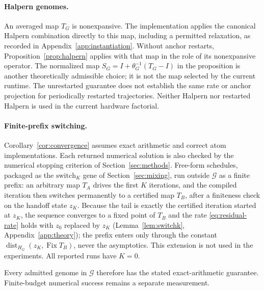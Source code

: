 \paragraph{Halpern genomes.}
An averaged map $T_G$ is nonexpansive. The implementation applies the
canonical Halpern combination directly to this map, including a permitted
relaxation, as recorded in Appendix~\ref{app:instantiation}. Without anchor
restarts, Proposition~\ref{prop:halpern} applies with that map in the role of
its nonexpansive operator. The normalized map
$S_G=I+\theta_G^{-1}(T_G-I)$ in the proposition is another theoretically
admissible choice; it is not the map selected by the current runtime.
The unrestarted guarantee does not establish the same rate or anchor
projection for periodically restarted trajectories. Neither Halpern nor
restarted Halpern is used in the current hardware factorial.

\paragraph{Finite-prefix switching.}
Corollary~\ref{cor:convergence} assumes exact arithmetic and correct atom
implementations. Each returned numerical solution is also checked by
the numerical stopping criterion of Section~\ref{sec:methods}. Free-form
schedules, packaged as the $\mathrm{switch}_K$ gene of
Section~\ref{sec:mixing}, run outside $\mathcal G$ as a finite prefix: an
arbitrary map $T_A$ drives the first $K$ iterations, and the compiled
iteration then switches permanently to a certified map $T_B$, after a
finiteness check on the handoff state $z_K$. Because the tail is exactly
the certified iteration started at $z_K$, the sequence converges to a fixed
point of $T_B$ and the rate \eqref{eq:residual-rate} holds with $z_0$
replaced by $z_K$ (Lemma~\ref{lem:switchk}, Appendix~\ref{app:theory}); the
prefix enters only through the constant
$\operatorname{dist}_{H_G}(z_K,\operatorname{Fix}T_B)$, never the
asymptotics. This extension is not used in the experiments. All reported
runs have $K=0$.

Every admitted genome in $\mathcal G$ therefore has the stated
exact-arithmetic guarantee. Finite-budget numerical success remains a separate
measurement.

\FloatBarrier
